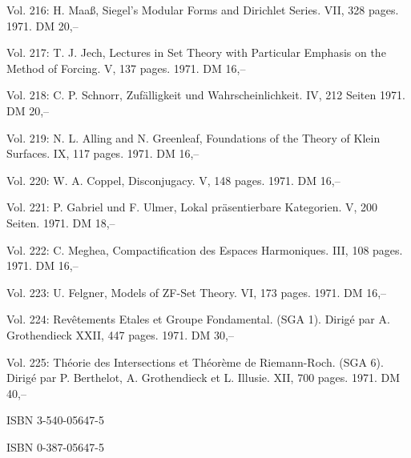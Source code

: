 Vol. 216: H. Maaß, Siegel's Modular Forms and Dirichlet Series. VII, 328 pages. 1971. DM 20,--

Vol. 217: T. J. Jech, Lectures in Set Theory with Particular Emphasis on the Method of Forcing. V, 137 pages. 1971. DM 16,--

Vol. 218: C. P. Schnorr, Zufälligkeit und Wahrscheinlichkeit. IV, 212 Seiten 1971. DM 20,--

Vol. 219: N. L. Alling and N. Greenleaf, Foundations of the Theory of Klein Surfaces. IX, 117 pages. 1971. DM 16,--

Vol. 220: W. A. Coppel, Disconjugacy. V, 148 pages. 1971. DM 16,--

Vol. 221: P. Gabriel und F. Ulmer, Lokal präsentierbare Kategorien. V, 200 Seiten. 1971. DM 18,--

Vol. 222: C. Meghea, Compactification des Espaces Harmoniques. III, 108 pages. 1971. DM 16,--

Vol. 223: U. Felgner, Models of ZF-Set Theory. VI, 173 pages. 1971. DM 16,--

Vol. 224: Revêtements Etales et Groupe Fondamental. (SGA 1). Dirigé par A. Grothendieck XXII, 447 pages. 1971. DM 30,--

Vol. 225: Théorie des Intersections et Théorème de Riemann-Roch. (SGA 6). Dirigé par P. Berthelot, A. Grothendieck et L. Illusie. XII, 700 pages. 1971. DM 40,--

ISBN 3-540-05647-5\par
ISBN 0-387-05647-5
